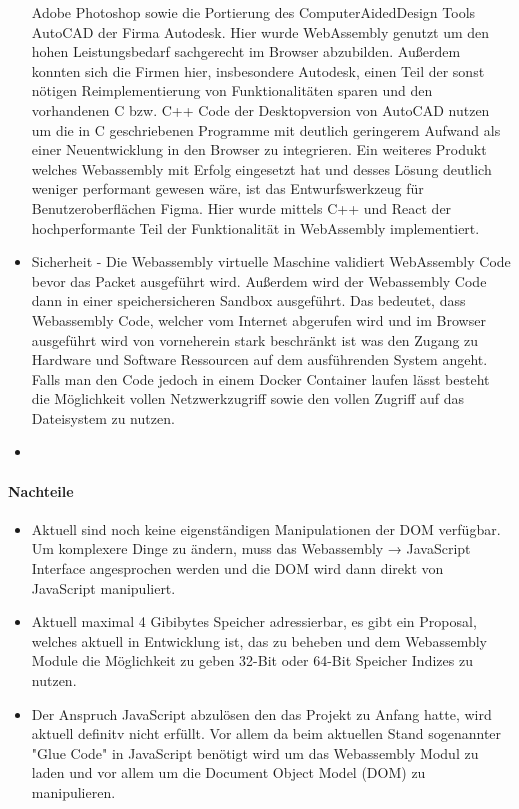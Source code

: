 \begin{itemize}
            Adobe Photoshop sowie die Portierung des ComputerAidedDesign Tools AutoCAD der Firma Autodesk. Hier wurde WebAssembly genutzt um den hohen Leistungsbedarf sachgerecht im Browser abzubilden.
            Außerdem konnten sich die Firmen hier, insbesondere Autodesk, einen Teil der sonst nötigen Reimplementierung von Funktionalitäten sparen und den vorhandenen C bzw. C++ Code der Desktopversion
            von AutoCAD nutzen um die in C geschriebenen Programme mit deutlich geringerem Aufwand als einer Neuentwicklung in den Browser zu integrieren. Ein weiteres Produkt welches Webassembly
        	mit Erfolg eingesetzt hat und desses Lösung deutlich weniger performant gewesen wäre, ist das Entwurfswerkzeug für Benutzeroberflächen Figma. Hier wurde mittels C++ und React der hochperformante Teil der Funktionalität
            in WebAssembly implementiert.
    \item   Sicherheit - Die Webassembly virtuelle Maschine validiert WebAssembly Code bevor das Packet ausgeführt wird. Außerdem wird der Webassembly Code dann in einer speichersicheren Sandbox ausgeführt.
            Das bedeutet, dass Webassembly Code, welcher vom Internet abgerufen wird und im Browser ausgeführt wird von vorneherein stark beschränkt ist was den Zugang zu Hardware und Software
            Ressourcen auf dem ausführenden System angeht. Falls man den Code jedoch in einem Docker Container laufen lässt besteht die Möglichkeit vollen Netzwerkzugriff sowie den vollen Zugriff auf das Dateisystem zu nutzen.
    \item   
\end{itemize}
\paragraph*{Nachteile}
\begin{itemize}
    \item   Aktuell sind noch keine eigenständigen Manipulationen der DOM verfügbar. Um komplexere Dinge zu ändern, muss das Webassembly → JavaScript Interface angesprochen werden
            und die DOM wird dann direkt von JavaScript manipuliert.
    \item   Aktuell maximal 4 Gibibytes Speicher adressierbar, es gibt ein Proposal, welches aktuell in Entwicklung ist, das zu beheben und dem
            Webassembly Module die Möglichkeit zu geben 32-Bit oder 64-Bit Speicher Indizes zu nutzen.
    \item   Der Anspruch JavaScript abzulösen den das Projekt zu Anfang hatte, wird aktuell definitv nicht erfüllt. Vor allem da beim aktuellen Stand sogenannter "Glue Code" in JavaScript benötigt 
            wird um das Webassembly Modul zu laden und vor allem um die Document Object Model (DOM) zu manipulieren.
\end{itemize}
